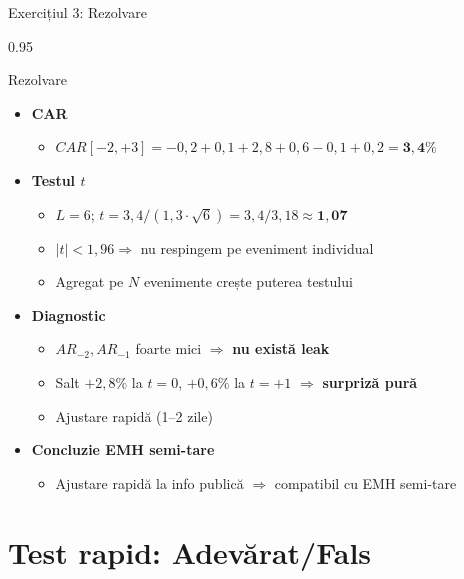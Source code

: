 \documentclass[9pt, aspectratio=169, t]{beamer}
\begin{document}
\begin{frame}[shrink=15]{Exercițiul 3: Rezolvare}
\begin{cminipage}{0.95\textwidth}
\begin{exampleblock}{Rezolvare}
\begin{itemize}\setlength{\itemsep}{0pt}
    \item \textbf{CAR}
    \begin{itemize}\setlength{\itemsep}{0pt}
        \item $CAR[-2, +3] = -0{,}2 + 0{,}1 + 2{,}8 + 0{,}6 - 0{,}1 + 0{,}2 = \mathbf{3{,}4\%}$
    \end{itemize}
    \item \textbf{Testul $t$}
    \begin{itemize}\setlength{\itemsep}{0pt}
        \item $L = 6$; $t = 3{,}4/(1{,}3 \cdot \sqrt{6}) = 3{,}4/3{,}18 \approx \mathbf{1{,}07}$
        \item $|t| < 1{,}96 \Rightarrow$ nu respingem pe eveniment individual
        \item Agregat pe $N$ evenimente crește puterea testului
    \end{itemize}
    \item \textbf{Diagnostic}
    \begin{itemize}\setlength{\itemsep}{0pt}
        \item $AR_{-2}, AR_{-1}$ foarte mici $\Rightarrow$ \textbf{nu există leak}
        \item Salt $+2{,}8\%$ la $t=0$, $+0{,}6\%$ la $t=+1$ $\Rightarrow$ \textbf{surpriză pură}
        \item Ajustare rapidă (1--2 zile)
    \end{itemize}
    \item \textbf{Concluzie EMH semi-tare}
    \begin{itemize}\setlength{\itemsep}{0pt}
        \item Ajustare rapidă la info publică $\Rightarrow$ compatibil cu EMH semi-tare
    \end{itemize}
\end{itemize}
\end{exampleblock}
\end{cminipage}
\end{frame}

\section{Test rapid: Adevărat/Fals}
\end{document}
